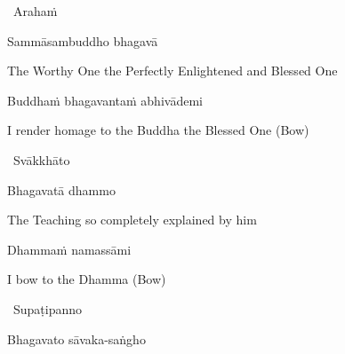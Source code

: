 \vspace{5pt}

\begin{leader}
  \anglebracketleft\ \hspace{-0.5mm}Arahaṁ \hspace{-0.5mm}\anglebracketright\
\end{leader}

\vspace{-0.5cm}

Sammāsambuddho bhagavā

\begin{english}
  The Worthy One the Perfectly Enlightened and Blessed One
\end{english}

Buddhaṁ bhagavantaṁ abhivādemi

\begin{english}
  I render homage to the Buddha the Blessed One \hfill{\textnormal{\ifafiveversion\fontsize{12.5}{18}\fi\ifasixversion\fontsize{9}{13}\fi\selectfont (Bow)}}
\end{english}

\begin{leader}
  \anglebracketleft\ \hspace{-0.5mm}Svākkhāto \hspace{-0.5mm}\anglebracketright\
\end{leader}

\vspace{-0.5cm}

Bhagavatā dhammo

\begin{english}
  The Teaching so completely explained by him
\end{english}

Dhammaṁ namassāmi

\begin{english}
  I bow to the Dhamma \hfill{\textnormal{\ifafiveversion\fontsize{12.5}{18}\fi\ifasixversion\fontsize{9}{13}\fi\selectfont (Bow)}}
\end{english}

\begin{leader}
  \anglebracketleft\ \hspace{-0.5mm}Supaṭipanno \hspace{-0.5mm}\anglebracketright\
\end{leader}

\vspace{-0.5cm}

Bhagavato sāvaka-saṅgho

